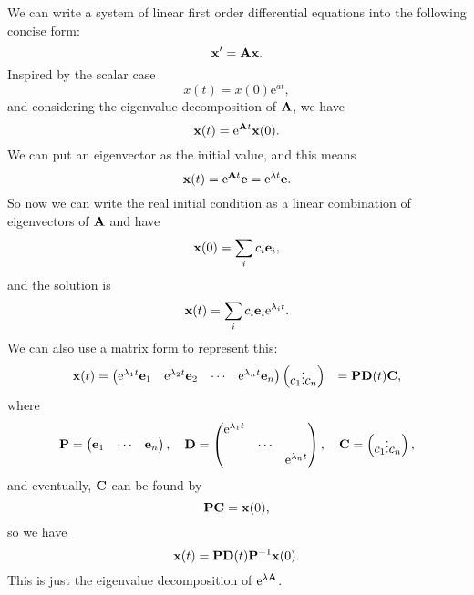 \documentclass[hyperref, a4paper]{article}
\newcommand*{\ee}{\mathrm{e}}
\def\\{}%
\newcommand*{\mat}[1]{\vb{#1}}
\begin{document}
We can write a system of linear first order differential equations 
into the following concise form:
\begin{equation}
    \vb{x}' = \mat{A} \vb{x}.
\end{equation}
Inspired by the scalar case 
\begin{equation}
    x(t) = x(0) \ee^{a t},
\end{equation}
and considering the eigenvalue decomposition of $\mat{A}$, 
we have 
\begin{equation}
    \vb{x} (t) = \ee^{\mat{A} t} \vb{x}(0).
\end{equation}
We can put an eigenvector as the initial value, 
and this means 
\begin{equation}
    \mat{x}(t) = \ee^{\mat{A} t} \vb{e} = \ee^{\lambda t} \vb{e}.
\end{equation}
So now we can write the real initial condition as a linear combination 
of eigenvectors of $\mat{A}$
and have 
\begin{equation}
    \vb{x}(0) = \sum_i c_i \vb{e}_i,
\end{equation}
and the solution is 
\begin{equation}
    \vb{x}(t) = \sum_i c_i \vb{e}_i \ee^{\lambda_i t}.
\end{equation}
We can also use a matrix form to represent this: 
\begin{equation}
    \begin{aligned}
        \vb{x}(t) &= \pmqty{
            \ee^{\lambda_1 t} \vb{e}_1 & 
            \ee^{\lambda_2 t} \vb{e}_2 &
            \cdots &
            \ee^{\lambda_n t} \vb{e}_n
        } \pmqty{
            c_1 \\ \vdots \\ c_n
        } \\
        &= \mat{P} \mat{D}(t) \mat{C}, 
    \end{aligned}
\end{equation}
where 
\begin{equation}
    \mat{P} = \pmqty{
        \vb{e}_1 & \cdots & \vb{e}_n
    }, \quad 
    \mat{D} = \pmqty{
        \dmat{
            \ee^{\lambda_1 t}, \cdots, \ee^{\lambda_n t}
        }
    }, \quad 
    \mat{C} = \pmqty{
        c_1 \\ \vdots \\ c_n
    },
\end{equation}
and eventually, $\mat{C}$ can be found by 
\begin{equation}
    \mat{P} \mat{C} = \vb{x}(0),
\end{equation}
so we have 
\begin{equation}
    \vb{x}(t) = \mat{P} \mat{D}(t) \mat{P}^{-1} \vb{x}(0).
\end{equation}
This is just the eigenvalue decomposition of $\ee^{\lambda \mat{A}}$.
\end{document}
